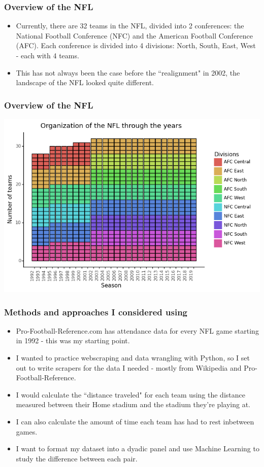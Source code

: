 \documentclass[t]{beamer}
\begin{document}
\begin{frame}
\frametitle{Overview of the NFL}
	
	\begin{itemize}
	\item{Currently, there are 32 teams in the NFL, divided into 2 conferences: the National Football Conference (NFC) and the American Football Conference (AFC). Each conference is divided into 4 divisions: North, South, East, West - each with 4 teams. }
	
	
	\item<2-> This has not always been the case before the ``realignment" in 2002, the landscape of the NFL looked quite different. 	
	

\end{itemize}
\end{frame}

\begin{frame}
\frametitle{Overview of the NFL}
\centering\includegraphics[width=\linewidth]{../09_figures/plot_div_team_count.png}
\end{frame}


\begin{frame}
\frametitle{Methods and approaches I considered using}
\begin{itemize}
\item<1-> Pro-Football-Reference.com has attendance data for every NFL game starting in 1992 - this was my starting point.
\item<2-> I wanted to practice webscraping and data wrangling with Python, so I set out to write scrapers for the data I needed - mostly from Wikipedia and Pro-Football-Reference.
\item<3-> I would calculate the ``distance traveled" for each team using the distance measured between their Home stadium and the stadium they're playing at.
\item<4-> I can also calculate the amount of time each team has had to rest inbetween games. 
\item<5-> I want to format my dataset into a dyadic panel and use Machine Learning to study the difference between each pair.

\end{itemize}
\end{frame}
\end{document}
